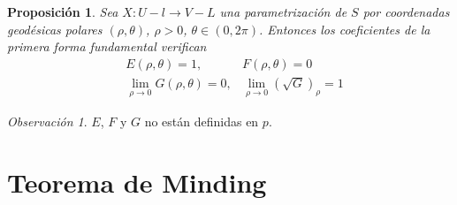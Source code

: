 \documentclass{report}
\newtheorem{proposition}[theorem]{Proposición}
\theoremstyle{remark}
\newtheorem*{remark}{Observación}
\theoremstyle{remark}
\theoremstyle{definition}
\theoremstyle{definition}
\theoremstyle{definition}
\begin{document}
\begin{proposition}
    Sea $X: U-l \to V-L$ una parametrización de $S$ por coordenadas geodésicas polares $(\rho, \theta)$, $\rho>0$, $\theta \in (0, 2\pi)$.
    Entonces los coeficientes de la primera forma fundamental verifican
    \begin{align*}
         & E(\rho, \theta) = 1,                          & F(\rho, \theta) = 0                          \\
         & \lim\limits_{\rho \to 0} G(\rho, \theta) = 0, & \lim\limits_{\rho \to 0} (\sqrt{G})_\rho = 1
    \end{align*}
\end{proposition}

\begin{remark}
    $E$, $F$ y $G$ no están definidas en $p$.
\end{remark}

\section{Teorema de Minding}
\end{document}
